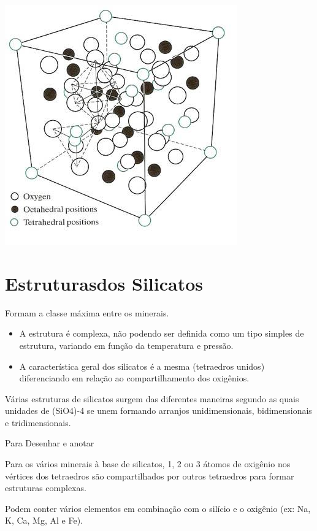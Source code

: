   \includegraphics[scale=0.5,trim={0 0 0 0}]{figures/MgAlO}

\section{Estruturasdos Silicatos}
Formam a classe máxima entre os minerais.
\begin{itemize}
	\item A estrutura é complexa, não podendo ser definida como um tipo simples de estrutura, variando em função da temperatura e pressão.
	\item A característica geral dos silicatos é a mesma (tetraedros unidos) diferenciando em relação ao compartilhamento dos oxigênios.
\end{itemize}
Várias estruturas de silicatos surgem das diferentes maneiras segundo as quais unidades de (SiO4)-4 se unem formando arranjos unidimensionais, bidimensionais e tridimensionais.

Para Desenhar e anotar
\vspace{100px}

Para os vários minerais à base de silicatos, 1, 2 ou 3 átomos de oxigênio nos vértices dos tetraedros são compartilhados por outros tetraedros para formar estruturas complexas.

Podem conter vários elementos em combinação com o silício e o oxigênio (ex: Na, K, Ca, Mg, Al e Fe).

